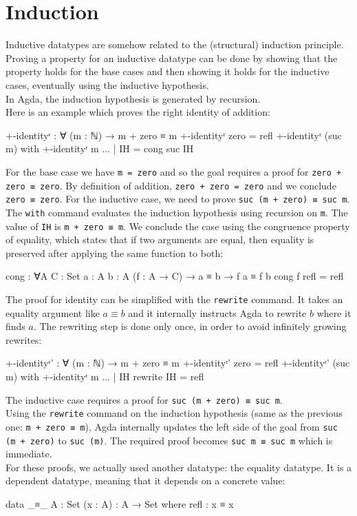 \section{Induction}
Inductive datatypes are somehow related to the (structural) induction principle. Proving a property for an inductive datatype can be done by showing that the property holds for the base cases and then showing it holds for the inductive cases, eventually using the inductive hypothesis.\\
In Agda, the induction hypothesis is generated by recursion.\\
Here is an example which proves the right identity of addition:
\begin{agda}
+-identityʳ : ∀ (m : ℕ) → m + zero ≡ m
+-identityʳ zero = refl
+-identityʳ (suc m) with +-identityʳ m
... | IH = cong suc IH
\end{agda}
For the base case we have \texttt{m = zero} and so the goal requires a proof for \texttt{zero + zero ≡ zero}. By definition of addition, \texttt{zero + zero = zero} and we conclude \texttt{zero ≡ zero}. For the inductive case, we need to prove \texttt{suc (m + zero) ≡ suc m}. The \texttt{with} command evaluates the induction hypothesis using recursion on \texttt{m}. The value of \texttt{IH} is \texttt{m + zero ≡ m}. We conclude the case using the congruence property of equality, which states that if two arguments are equal, then equality is preserved after applying the same function to both:
\begin{agda}
cong : ∀{A C : Set} {a : A} {b : A} 
  (f : A → C) 
  → a ≡ b 
  → f a ≡ f b
cong f refl = refl
\end{agda}
The proof for identity can be simplified with the \texttt{rewrite} command. It takes an equality argument like $a \equiv b$ and it internally instructs Agda to rewrite $b$ where it finds $a$. The rewriting step is done only once, in order to avoid infinitely growing rewrites:
\begin{agda}
+-identityʳ' : ∀ (m : ℕ) → m + zero ≡ m
+-identityʳ' zero = refl
+-identityʳ' (suc m) with +-identityʳ m
... | IH rewrite IH = refl
\end{agda}
The inductive case requires a proof for \texttt{suc (m + zero) ≡ suc m}.\\
Using the \texttt{rewrite} command on the induction hypothesis (same as the previous one: \texttt{m + zero ≡ m}), Agda internally updates the left side of the goal from \texttt{suc (m + zero)} to \texttt{suc (m)}. The required proof becomes \texttt{suc m ≡ suc m} which is immediate.\\
For these proofs, we actually used another datatype: the equality datatype. It is a dependent datatype, meaning that it depends on a concrete value:
\begin{agda}
data _≡_ {A : Set} (x : A) : A → Set where
  refl : x ≡ x
\end{agda}
